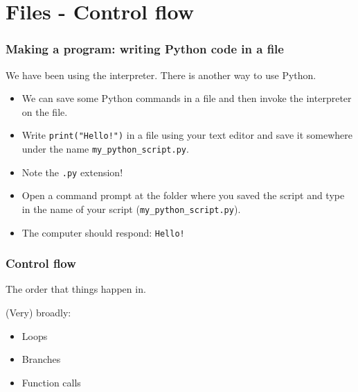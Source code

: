 \documentclass[notes]{beamer}
\begin{document}
	\section{Files - Control flow}
	
	\begin{frame}[fragile]
		\frametitle{Making a program: writing Python code in a file}
		We have been using the interpreter. There is another way to use Python.
		\begin{itemize}
			\item We can save some Python commands in a file and then invoke the interpreter on the file.
			\pause
			\item Write \colorbox{codebg}{\lstinline|print("Hello!")|} in a file using your text editor and save it somewhere under the name \lstinline|my_python_script.py|.
			\item Note the \lstinline|.py| extension!
			\pause
			\item Open a command prompt at the folder where you saved the script and type in the name of your script (\lstinline|my_python_script.py|).
			\item The computer should respond: \texttt{Hello!}
		\end{itemize}
	\end{frame}
	
	\begin{frame}[fragile]
		\frametitle{Control flow}
		The order that things happen in.

		\pause

		(Very) broadly:
		\begin{itemize}
			\item Loops
			\item Branches
			\item Function calls
		\end{itemize}

	\end{frame}
\end{document}
